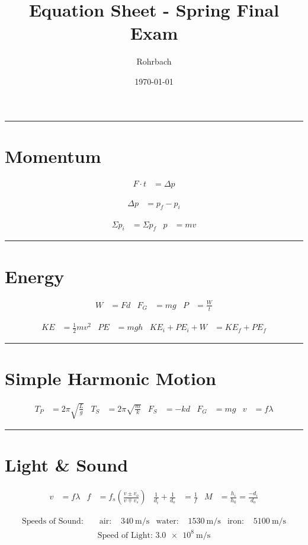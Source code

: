 \documentclass[11pt]{exam}
\title{Equation Sheet - Spring Final Exam}
\author{Rohrbach}
\date{\today}
\begin{document}
\maketitle

\vs
\hrule

\section*{Momentum}

  \begin{align*}
    F \cdot t &=  \Delta p
  \end{align*}

  \begin{align*}
    \Delta p  &= p_f - p_i
  \end{align*}

  \begin{align*}
      \Sigma p_i &= \Sigma p_f
    & p &=mv
  \end{align*}


\vs
\hrule
\section*{Energy}

    
  \begin{align*}
      W   &=  Fd
    & F_G &=  mg
    & P   &=  \frac{W}{t}
  \end{align*}

  \begin{align*}
      KE    &= \frac{1}{2}mv^2 
    & PE    &= mgh
    & KE_i + PE_i + W &= KE_f + PE_f
  \end{align*}

\vs
\hrule
\section*{Simple Harmonic Motion}

    
  \begin{align*}
      T_P &=  2\pi \sqrt{\frac{L}{g}}
    & T_S &=  2\pi \sqrt{\frac{m}{k}}
    & F_S &=  -kd
    & F_G &=  mg
    & v   &=  f\lambda
  \end{align*}

\vs
\hrule
\section*{Light \& Sound}

    
  \begin{align*}
      v   &=  f\lambda
    & f   &= f_s \left( \frac{v\pm v_o}{v\mp v_s} \right)
    & \frac{1}{d_i} + \frac{1}{d_o} &= \frac{1}{f}
    & M &= \frac{h_i}{h_0} = \frac{-d_i}{d_o}
  \end{align*}

  \begin{align*}
    \text{Speeds of Sound: } & 
    & \text{air: }   & \SI{340}{\meter\per\second}
    & \text{water: } & \SI{1530}{\meter\per\second}
    & \text{iron: }  & \SI{5100}{\meter\per\second}
  \end{align*}
  \begin{align*}
    \text{Speed of Light: }
    \SI{3.0e8}{\meter\per\second}
  \end{align*}
\end{document}
